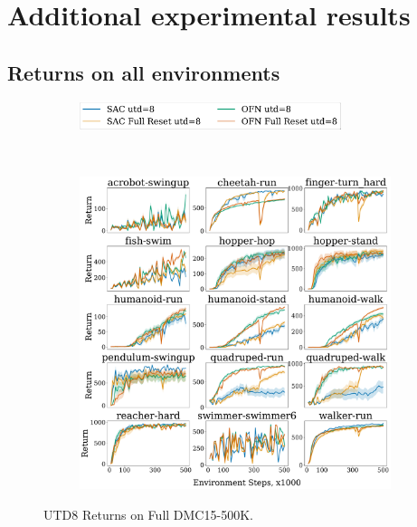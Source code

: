 \section{Additional experimental results} \label{app:exp}

\subsection{Returns on all environments} \label{app:exp_ret}

\begin{figure}[H]
\centering
    \begin{subfigure}[b]{0.8\textwidth}
        \centering
        \includegraphics[height=0.8cm]{figures/dissecting/main_exp/utd_8_return_legend.pdf}
    \end{subfigure}\\%
    \begin{subfigure}[b]{1\textwidth}
        \centering
        \includegraphics[width=15cm, trim=0cm 0cm 0cm 0cm ,clip]{figures/dissecting/main_exp/utd_8_return.pdf}
    \end{subfigure}%
    \caption{UTD8 Returns on Full DMC15-500K.}
    \label{fig:utd8_ret}
\end{figure}


